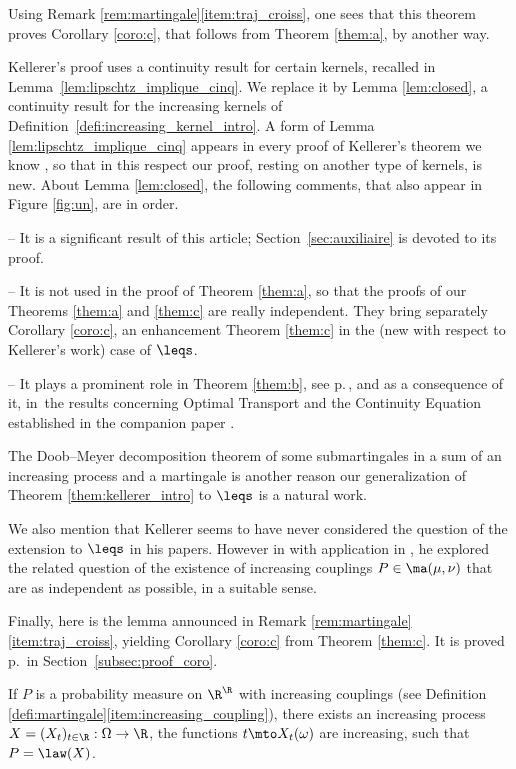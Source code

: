 Using Remark \ref{rem:martingale}\eqref{item:traj_croiss}, one sees that this theorem proves Corollary \ref{coro:c}, that follows from Theorem \ref{them:a}, by another way.

Kellerer's proof uses a continuity result for certain kernels, recalled in Lemma~\ref{lem:lipschtz_implique_cinq}. We replace it by Lemma \ref{lem:closed}, a continuity result for the increasing kernels of Definition~\ref{defi:increasing_kernel_intro}. A form of Lemma \ref{lem:lipschtz_implique_cinq} appears in every proof of Kellerer's theorem we know \cite{Ke72,Ke73,Low,HiRoYo14,BHS}, so that in this respect our proof, resting on another type of kernels, is new. About Lemma \ref{lem:closed}, the following comments, that also appear in Figure \ref{fig:un}, are in order.

-- It is a significant result of this article; Section~\ref{sec:auxiliaire} is devoted to its proof.

-- It is not used in the proof of Theorem \ref{them:a}, so that the proofs of our Theorems \ref{them:a} and \ref{them:c} are really independent. They bring separately Corollary \ref{coro:c}, an enhancement Theorem \ref{them:c} in the (new with respect to Kellerer's work) case of $\leqs$.

-- It plays a prominent role in Theorem \ref{them:b}, see p.\,\pageref{appel_lemme_closed}, and as a consequence of it, in~the results concerning Optimal Transport and the Continuity Equation established in the companion paper \cite{BouJui2}.

\begin{rem}The Doob--Meyer decomposition theorem of some submartingales in a sum of an increasing process and a martingale is another reason our generalization of Theorem \ref{them:kellerer_intro} to $\leqs$ is a natural work.
\end{rem}

We also mention that Kellerer seems to have never considered the question of the extension to $\leqs$ in his papers. However in \cite{Ke86} with application in \cite{Ke87}, he explored the related question of the existence of increasing couplings $P\in \ma(\mu,\nu)$ that are as independent as possible, in a suitable sense.

Finally, here is the lemma announced in Remark \ref{rem:martingale}\eqref{item:traj_croiss}, yielding Corollary \ref{coro:c} from Theorem \ref{them:c}. It is proved p.\,\pageref{subsec:proof_coro} in Section~\ref{subsec:proof_coro}.

\begin{lem}\label{coro}If $P$ is a probability measure on $\R^\R$ with increasing couplings (see Definition \ref{defi:martingale}\eqref{item:increasing_coupling}), there exists an increasing process $X=(X_t)_{t\in\R}:\Omega\to\R$, \ie the functions $t\mto X_t(\omega)$ are increasing, such that $P=\law(X)$.
\end{lem}

